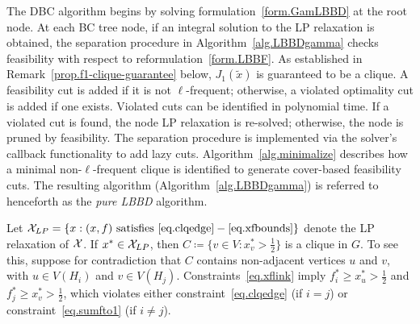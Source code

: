 The DBC algorithm begins by solving formulation~\eqref{form.GamLBBD}
at the root node. At each BC tree node, if an integral solution to the
LP relaxation is obtained, the separation procedure in
Algorithm~\ref{alg.LBBDgamma} checks feasibility with respect to
reformulation~\eqref{form.LBBF}. 
As established in
Remark~\ref{prop.f1-clique-guarantee} below, $J_1(\widetilde{x})$ is
guaranteed to be a clique. A feasibility cut is added if it is not
$\ell$-frequent; otherwise, a violated optimality cut is added if one
exists. Violated cuts can be identified in polynomial time. If a violated cut is found, the node LP relaxation
is re-solved; otherwise, the node is pruned by feasibility. The
separation procedure is implemented via the solver's callback
functionality to add lazy cuts. Algorithm~\ref{alg.minimalize}
describes how a minimal non-$\ell$-frequent clique is identified to
generate cover-based feasibility cuts. The resulting algorithm (Algorithm~\ref{alg.LBBDgamma}) is referred to henceforth as the
\textit{pure LBBD} algorithm. 

\begin{remark}\label{prop.f1-clique-guarantee}
Let $\mathcal{X}_{LP} = \{x : (x,f) \text{ satisfies }
\eqref{eq.clqedge}-\eqref{eq.xfbounds}\}$ denote the LP relaxation
of $\mathcal{X}$. If $x^* \in \mathcal{X}_{LP}$, then
$C \coloneqq \{v \in V : x^*_v > \tfrac{1}{2}\}$ is a clique in $G$.
To see this, suppose for contradiction that $C$ contains non-adjacent
vertices $u$ and $v$, with $u \in V(H_i)$ and $v \in V(H_j)$.
Constraints~\eqref{eq.xflink} imply $f_i^* \ge x_u^* > \tfrac{1}{2}$
and $f_j^* \ge x_v^* > \tfrac{1}{2}$, which violates either
constraint~\eqref{eq.clqedge} (if $i = j$) or
constraint~\eqref{eq.sumfto1} (if $i \ne j$).
\end{remark}

\begin{algorithm}[htbp]
\caption{Clique Minimalization}
\label{alg.minimalize}
\end{algorithm}

